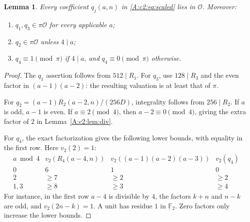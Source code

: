 \documentclass[11pt]{article}
\newtheorem{lemma}[theorem]{Lemma}
\numberwithin{equation}{section}
\begin{document}
\begin{lemma}\label{A:c2:lem:units}
Every coefficient $q_j(a,n)$ in \eqref{A:c2:eq:scaled} lies in $\mathcal O$. Moreover:
\begin{enumerate}
\item $q_1,q_3\in\pi\mathcal O$ for every applicable $a$;
\item $q_2\in\pi\mathcal O$ unless $4\mid a$;
\item $q_4\equiv1\pmod\pi$ if $4\mid a$, and $q_4\equiv0\pmod\pi$ otherwise.
\end{enumerate}
\end{lemma}
\begin{proof}
The $q_1$ assertion follows from $512\mid R_1$. For $q_3$, use $128\mid R_3$ and the even factor in $(a-1)(a-2)$: the resulting valuation is at least that of $\pi$.

For $q_2=(a-1)R_2(a-2,n)/(256D)$, integrality follows from $256\mid R_2$. If $a$ is odd, $a-1$ is even. If $a\equiv2\pmod4$, then $a-2\equiv0\pmod4$, giving the extra factor of $2$ in Lemma~\ref{A:c2:lem:div}.

For $q_4$, the exact factorization gives the following lower bounds, with equality in the first row. Here $v_2(2)=1$:
\[
\begin{array}{c|c|c|c}
 a\bmod4 & v_2(R_4(a-4,n)) &
 v_2((a-1)(a-2)(a-3)) & v_2(q_4)\\\hline
 0&6&1&0\\
 2&\geq7&\geq2&\geq2\\
 1,3&\geq8&\geq3&\geq4
\end{array}
\]
For instance, in the first row $a-4$ is divisible by $4$, the factors $k+n$ and $n-k$ are odd, and $v_2(2n-k)=1$. A unit has residue $1$ in $\mathbb F_2$. Zero factors only increase the lower bounds.
\end{proof}
\end{document}
